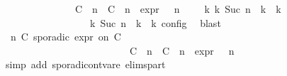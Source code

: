 \begin{isabellebody}
\ \ \ \ \ \ \ \ \ \ \ \ \ \ \ {\isacartoucheopen}{\isacharparenleft}{\isacharparenleft}{\isacharparenleft}{\isacharparenleft}C\ {\isasymUp}\ n{\isacharparenright}\ {\isacharhash}\ {\isacharparenleft}C\ {\isasymDown}\ n\ {\isacharat}{\isasymsharp}\ {\isasymtau}\isactrlsub e\isactrlsub x\isactrlsub p\isactrlsub r{\isacharparenright}\ {\isacharhash}\ {\isasymGamma}{\isacharparenright}{\isacharcomma}\ n\ {\isasymturnstile}\ {\isasymPsi}\ {\isasymtriangleright}\ {\isasymPhi}{\isacharparenright}\ {\isasymhookrightarrow}\isactrlbsup k\isactrlesup \ {\isacharparenleft}{\isasymGamma}\isactrlsub k{\isacharcomma}\ Suc\ n\ {\isasymturnstile}\ {\isasymPsi}\isactrlsub k\ {\isasymtriangleright}\ {\isasymPhi}\isactrlsub k{\isacharparenright}{\isacharparenright}{\isacartoucheclose}\isanewline
\ \ \ \ \ \ \ \ \ \ \ \ \ \ \ {\isacharasterisk}{\isacharcolon}{\isacartoucheopen}{\isasymrho}\ {\isasymin}\ {\isasymlbrakk}\ {\isasymGamma}\isactrlsub k{\isacharcomma}\ Suc\ n\ {\isasymturnstile}\ {\isasymPsi}\isactrlsub k\ {\isasymtriangleright}\ {\isasymPhi}\isactrlsub k\ {\isasymrbrakk}\isactrlsub c\isactrlsub o\isactrlsub n\isactrlsub f\isactrlsub i\isactrlsub g{\isacartoucheclose}\ \isamarkupfalse%
\ blast\isanewline
\ \ \ \ \ \ \ \ \ \ \isamarkupfalse%
\ \isamarkupfalse%
\ {\isacartoucheopen}{\isacharparenleft}{\isasymGamma}{\isacharcomma}\ n\ {\isasymturnstile}{\isacharparenleft}{\isacharparenleft}C\ sporadic{\isasymsharp}\ {\isasymtau}\isactrlsub e\isactrlsub x\isactrlsub p\isactrlsub r\ on\ C\ {\isacharhash}\ {\isasymPsi}{\isacharparenright}\ {\isasymtriangleright}\ {\isasymPhi}{\isacharparenright}\isanewline
\ \ \ \ \ \ \ \ \ \ \ \ \ \ \ \ \ \ \ \ \ \ \ \ \ \ {\isasymhookrightarrow}{\isacharparenleft}{\isacharparenleft}{\isacharparenleft}C\ {\isasymUp}\ n{\isacharparenright}\ {\isacharhash}\ {\isacharparenleft}C\ {\isasymDown}\ n\ {\isacharat}{\isasymsharp}\ {\isasymtau}\isactrlsub e\isactrlsub x\isactrlsub p\isactrlsub r{\isacharparenright}\ {\isacharhash}\ {\isasymGamma}{\isacharparenright}{\isacharcomma}\ n\ {\isasymturnstile}\ {\isasymPsi}\ {\isasymtriangleright}\ {\isasymPhi}{\isacharparenright}{\isacartoucheclose}\isanewline
\ \ \ \ \ \ \ \ \ \ \ \ \isamarkupfalse%
\ {\isacharparenleft}simp\ add{\isacharcolon}\ sporadic{\isacharunderscore}on{\isacharunderscore}tvar{\isacharunderscore}e{}\ elims{\isacharunderscore}part{\isacharparenright}\isanewline

\end{isabellebody}
